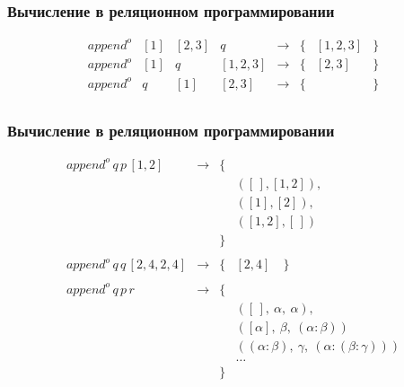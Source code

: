 \documentclass{beamer}
\begin{document}
\begin{frame}[fragile]
  \transwipe[direction=90]
  \frametitle{Вычисление в реляционном программировании}
  
$$ 
\begin{array}{lccccccl}
append^o & [1] & [2, 3] & q         &\rightarrow& \{ &  [1, 2, 3] & \} \\
append^o & [1] & q      & [1, 2, 3] &\rightarrow& \{ & [2, 3] & \} \\
append^o & q   & [1]    & [2, 3]    &\rightarrow& \{ & & \}  \\
\end{array}
$$

\end{frame}

\begin{frame}[fragile]
  \transwipe[direction=90]
  \frametitle{Вычисление в реляционном программировании}

$$ 
\begin{array}{rccl}
append^o \, q \, p \, [1, 2] &\rightarrow& \{ &                \\
                    &           &    & ([\,], [1,2]), \\
                    &           &    & ([1], [2]), \\
                    &           &    & ([1,2], [\,]) \\
                    &           & \} \\
                    &           & \\ 
append^o \, q \, q \, [2, 4, 2, 4] &\rightarrow& \{ &  [2, 4] \quad \} \\
                    &           & \\ 
append^o \, q \, p \, r      &\rightarrow& \{ &  \\
                    &           &    &([\,], \ \alpha, \ \alpha), \\
                    &           &    & ([\alpha], \  \beta, \ (\alpha:\beta)) \\
                    &           &    & ((\alpha : \beta),\  \gamma, \ (\alpha:(\beta:\gamma))) \\
                    &           &    & \dots \\
                    &           &    \}  \\
\end{array}
$$

\end{frame}
\end{document}
